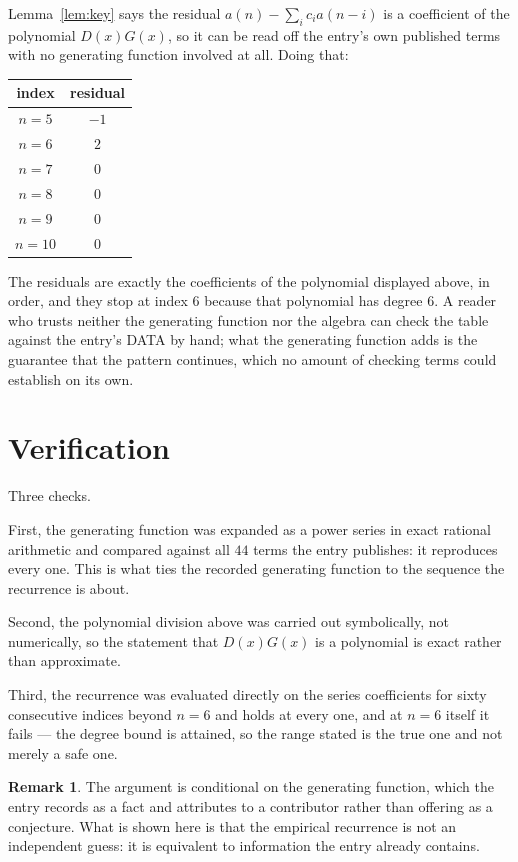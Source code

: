 \documentclass[11pt,a4paper]{article}
\theoremstyle{plain}
\theoremstyle{definition}
\newtheorem{remark}[theorem]{Remark}
\begin{document}
Lemma~\ref{lem:key} says the residual $a(n)-\sum_ic_ia(n-i)$ is a coefficient of the
polynomial $D(x)G(x)$, so it can be read off the entry's own published terms with no
generating function involved at all. Doing that:
\begin{center}
\begin{tabular}{cc}
index & residual \\ \hline
$n=5$ & $-1$ \\
$n=6$ & $2$ \\
$n=7$ & $0$ \\
$n=8$ & $0$ \\
$n=9$ & $0$ \\
$n=10$ & $0$
\end{tabular}
\end{center}
The residuals are exactly the coefficients of the polynomial displayed above, in order, and
they stop at index $6$ because that polynomial has degree $6$. A reader who trusts
neither the generating function nor the algebra can check the table against the entry's DATA
by hand; what the generating function adds is the guarantee that the pattern continues, which
no amount of checking terms could establish on its own.

\section{Verification}

Three checks.

First, the generating function was expanded as a power series in exact rational arithmetic and
compared against all $44$ terms the entry publishes: it reproduces every one. This is
what ties the recorded generating function to the sequence the recurrence is about.

Second, the polynomial division above was carried out symbolically, not numerically, so the
statement that $D(x)G(x)$ is a polynomial is exact rather than approximate.

Third, the recurrence was evaluated directly on the series coefficients for sixty consecutive
indices beyond $n=6$ and holds at every one, and at $n=6$ itself it fails --- the
degree bound is attained, so the range stated is the true one and not merely a safe one.

\begin{remark}
The argument is conditional on the generating function, which the entry records as a fact and
attributes to a contributor rather than offering as a conjecture. What is shown here is that
the empirical recurrence is not an independent guess: it is equivalent to information the
entry already contains.
\end{remark}
\end{document}
